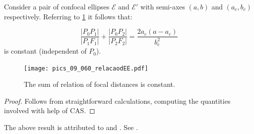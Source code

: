 \begin{proposition}
	Consider a pair of confocal ellipses $\mathcal{E}$ and $\mathcal{E}'$ with semi-axes $(a,b)$ and $(a_c,b_c)$ respectively. Referring to   \cref{fig:dEE1} it follows that:
	
	\[\frac{|P_0P_1|}{|P_1F_1|}+\frac{|P_0P_2|}{|P_2F_2|}=\frac{2 a_c (a-a_c)}{b_c^2}\]
	is constant (independent of $P_0$).
\label{prop:dEE1}	
\end{proposition}
\begin{figure} 
	\begin{center}	 
  \texttt{[image: pics\_09\_060\_relacaodEE.pdf]}
		\caption { The sum of relation of focal distances is constant. \label{fig:dEE1} }
	\end{center}
	
\end{figure}
\begin{proof} 
Follows from straightforward calculations, computing the quantities involved with help of CAS. 
\end{proof}

\begin{remark} 
The above result is attributed  to   \cite{milena2003} and  \cite{taba2004_magnetic}.  See \cite{akopyan2021}.
\end{remark}


